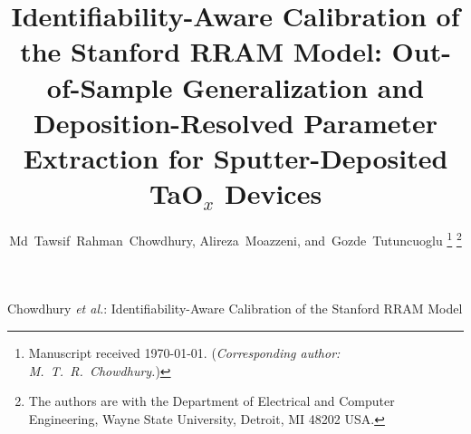 \documentclass[journal]{IEEEtran}
\begin{document}
\title{Identifiability-Aware Calibration of the Stanford RRAM Model:
Out-of-Sample Generalization and Deposition-Resolved Parameter Extraction
for Sputter-Deposited TaO$_x$ Devices}

\author{Md~Tawsif~Rahman~Chowdhury,
        Alireza~Moazzeni,
        and~Gozde~Tutuncuoglu%
\thanks{Manuscript received \today. (\emph{Corresponding author:
M.~T.~R.~Chowdhury.})}%
\thanks{The authors are with the Department of Electrical and Computer
Engineering, Wayne State University, Detroit, MI 48202 USA.}}

%
{Chowdhury \MakeLowercase{\textit{et al.}}: Identifiability-Aware Calibration of the Stanford RRAM Model}

\maketitle
\end{document}
